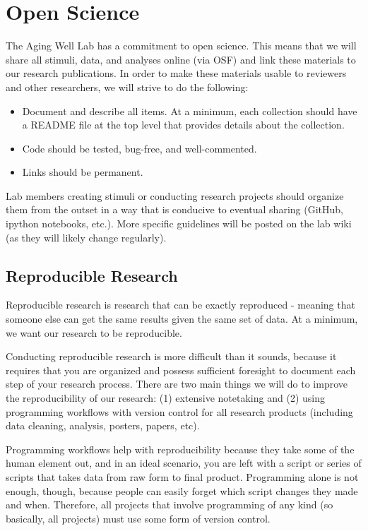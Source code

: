 \documentclass[]{book}
\providecommand{\tightlist}{%
  \setlength{\itemsep}{0pt}\setlength{\parskip}{0pt}}
\begin{document}
\hypertarget{open-science}{%
\section{Open Science}\label{open-science}}

The Aging Well Lab has a commitment to open science. This means that we will share all stimuli, data, and analyses online (via OSF) and link these materials to our research publications. In order to make these materials usable to reviewers and other researchers, we will strive to do the following:

\begin{itemize}
\tightlist
\item
  Document and describe all items. At a minimum, each collection should have a README file at the top level that provides details about the collection.\\
\item
  Code should be tested, bug-free, and well-commented.\\
\item
  Links should be permanent.
\end{itemize}

Lab members creating stimuli or conducting research projects should organize them from the outset in a way that is conducive to eventual sharing (GitHub, ipython notebooks, etc.). More specific guidelines will be posted on the lab wiki (as they will likely change regularly).

\hypertarget{reproducible-research}{%
\subsection{Reproducible Research}\label{reproducible-research}}

Reproducible research is research that can be exactly reproduced - meaning that someone else can get the same results given the same set of data. At a minimum, we want our research to be reproducible.

Conducting reproducible research is more difficult than it sounds, because it requires that you are organized and possess sufficient foresight to document each step of your research process. There are two main things we will do to improve the reproducibility of our research: (1) extensive notetaking and (2) using programming workflows with version control for all research products (including data cleaning, analysis, posters, papers, etc).

Programming workflows help with reproducibility because they take some of the human element out, and in an ideal scenario, you are left with a script or series of scripts that takes data from raw form to final product. Programming alone is not enough, though, because people can easily forget which script changes they made and when. Therefore, all projects that involve programming of any kind (so basically, all projects) must use some form of version control.
\end{document}
